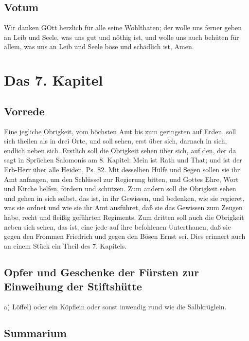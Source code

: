 \section{Votum}

Wir danken GOtt herzlich für alle seine Wohlthaten; der wolle uns ferner geben an Leib und Seele, was uns gut und nöthig ist, und wolle uns auch behüten für allem, was uns an Leib und Seele böse und schädlich ist, Amen.

\chapter{Das 7. Kapitel}

\section{Vorrede}

Eine jegliche Obrigkeit, vom höchsten Amt bis zum geringsten auf Erden, soll sich theilen als in drei Orte, und soll sehen, erst über sich, darnach in sich, endlich neben sich. Erstlich soll die Obrigkeit sehen über sich, auf den, der da sagt in Sprüchen Salomonis am 8. Kapitel: Mein ist Rath und That; und ist der Erb-Herr über alle Heiden, Ps. 82. Mit desselben Hülfe und Segen sollen sie ihr Amt anfangen, um den Schlüssel zur Regierung bitten, und Gottes Ehre, Wort und Kirche helfen, fördern und schützen. Zum andern soll die Obrigkeit sehen und gehen in sich selbst, das ist, in ihr Gewissen, und bedenken, wie sie regieret, was sie ordnet und wie sie ihr Amt ausführet, daß sie das Gewissen zum Zeugen habe, recht und fleißig geführten Regiments. Zum dritten soll auch die Obrigkeit neben sich sehen, das ist, eine jede auf ihre befohlenen Unterthanen, daß sie gegen den Frommen Friedrich und gegen den Bösen Ernst sei. Dies erinnert auch an einem Stück ein Theil des 7. Kapitels.

\section[Opfer und Geschenke der Fürsten zur Einweihung der]{Opfer und Geschenke der Fürsten zur Einweihung der Stiftshütte}

a) Löffel) oder ein Köpflein oder sonst inwendig rund wie die Salbkrüglein.

\section{Summarium}

